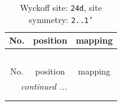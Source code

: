 \documentclass[fleqn,8pt]{jsarticle}
\begin{document}
\renewcommand{\arraystretch}{1.2}
\begin{longtable}{ccc}
\caption{Wyckoff site: {\tt 24d}, site symmetry: {\tt 2..1'}}
 \\
 \hline \hline
No. & position & mapping \\ \hline \endfirsthead

\multicolumn{2}{l}{\tablename\ \thetable{}} \\
 \hline \hline
No. & position & mapping \\ \hline \endhead

 \hline \hline
\multicolumn{2}{r}{\footnotesize\it continued ...} \\ \endfoot

 \hline \hline
\multicolumn{2}{r}{} \\ \endlastfoot


\end{longtable}
\end{document}
